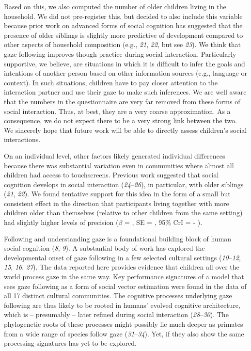 \documentclass[
  man,floatsintext]{apa6}
\begin{document}
Based on this, we also computed the number of older children living in the household. We did not pre-register this, but decided to also include this variable because prior work on advanced forms of social cognition has suggested that the presence of older siblings is slightly more predictive of development compared to other aspects of household composition (e.g., \emph{21}, \emph{22}, but see \emph{23}). We think that gaze following improves though practice during social interaction. Particularly supportive, we believe, are situations in which it is difficult to infer the goals and intentions of another person based on other information sources (e.g., language or context). In such situations, children have to pay closer attention to the interaction partner and use their gaze to make such inferences. We are well aware that the numbers in the questionnaire are very far removed from these forms of social interaction. Thus, at best, they are a very coarse approximation. As a consequence, we do not expect there to be a very strong link between the two. We sincerely hope that future work will be able to directly assess children's social interactions.

On an individual level, other factors likely generated individual differences because there was substantial variation even in communities where almost all children had access to touchscreens. Previous work suggested that social cognition develops in social interaction (\emph{24}--\emph{26}), in particular, with older siblings (\emph{21}, \emph{22}). We found tentative support for this idea in the form of a small but consistent effect in the direction that participants living together with more children older than themselves (relative to other children from the same setting) had slightly higher levels of precision (\(\beta\) = , SE = , 95\% CrI = - ).

Following and understanding gaze is a foundational building block of human social cognition (\emph{8}, \emph{9}). A substantial body of work has explored the developmental onset of gaze following in a few selected cultural settings (\emph{10}--\emph{12}, \emph{15}, \emph{16}, \emph{27}). The data reported here provides evidence that children all over the world process gaze in the same way. Key performance signatures of a model that sees gaze following as a form of social vector estimation were found in the data of all 17 distinct cultural communities. The cognitive processes underlying gaze following are thus likely to be rooted in humans' evolved cognitive architecture, which is -- presumably -- later refined during social interaction (\emph{28}--\emph{30}). The phylogenetic roots of these processes might possibly lie much deeper as primates from a wide range of species follow gaze (\emph{31}--\emph{34}). Yet, if they also show the same processing signatures has yet to be explored.
\end{document}
